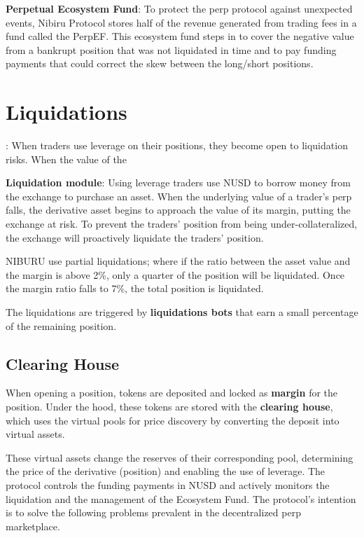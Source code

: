 \documentclass[11pt]{article}
\begin{document}
\textbf{Perpetual Ecosystem Fund}: To protect the perp protocol against unexpected events, Nibiru Protocol stores half of the revenue generated from trading fees in a fund called the PerpEF. This ecosystem fund steps in to cover the negative value from a bankrupt position that was not liquidated in time and to pay funding payments that could correct the skew between the long/short positions.


\section{Liquidations}: When traders use leverage on their positions, they become open to liquidation risks. When the value of the

\item \textbf{Liquidation module}: Using leverage traders use NUSD to borrow money from the exchange to purchase an asset. When the underlying value of a trader's perp falls, the derivative asset begins to approach the value of its margin, putting the exchange at risk. To prevent the traders’ position from being under-collateralized, the exchange will proactively liquidate the traders’ position.

NIBURU use partial liquidations; where if the 
ratio between the asset value and the margin is above 2\%, only a quarter of the position will be liquidated. Once the margin ratio falls to 7\%, the total position is liquidated. 

The liquidations are triggered by \textbf{liquidations bots} that earn a small percentage of the remaining position.

\subsection*{Clearing House}

When opening a position, tokens are deposited and locked as \textbf{margin} for the position. Under the hood, these tokens are stored with the \textbf{clearing house}, which uses the virtual pools for price discovery by converting the deposit into virtual assets. 

These virtual assets change the reserves of their corresponding pool, determining the price of the derivative (position) and enabling the use of leverage. The protocol controls the funding payments in NUSD and actively monitors the liquidation and the management of the Ecosystem Fund. The protocol’s intention is to solve the following problems prevalent in the decentralized perp marketplace.
\end{document}
